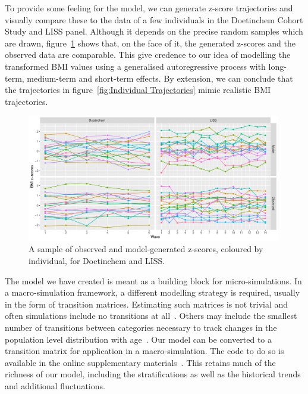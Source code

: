 \documentclass{imammb}
\numberwithin{equation}{section}
\begin{document}
To provide some feeling for the model, we can generate z-score trajectories and visually compare these to the data of a few individuals in the Doetinchem Cohort Study and LISS panel. Although it depends on the precise random samples which are drawn, figure~\ref{fig:Individual Z-Score Trajectories} shows that, on the face of it, the generated z-scores and the observed data are comparable. This give credence to our idea of modelling the transformed BMI values using a generalised autoregressive process with long-term, medium-term and short-term effects. By extension, we can conclude that the trajectories in figure~\ref{fig:Individual Trajectories} mimic realistic BMI trajectories.

\vspace{-4mm}

\begin{figure}[!h]
\centering\includegraphics[width=0.99\textwidth] {"Figures/Individual-Z-Score-Trajectories.pdf"}
\vspace{-1mm}
\caption{A sample of observed and model-generated z-scores, coloured by individual, for Doetinchem and LISS.}
\label{fig:Individual Z-Score Trajectories}
\vspace*{-9pt}
\end{figure}

The model we have created is meant as a building block for micro-simulations. In a macro-simulation framework, a different modelling strategy is required, usually in the form of transition matrices. Estimating such matrices is not trivial and often simulations include no transitions at all~\citep{Hendriksen2015}. Others may include the smallest number of transitions between categories necessary to track changes in the population level distribution with age~\citep{VandeKassteele2012}. Our model can be converted to a transition matrix for application in a macro-simulation. The code to do so is available in the online supplementary materials~\citep{Bogaardt2023}. This retains much of the richness of our model, including the stratifications as well as the historical trends and additional fluctuations.
\end{document}
